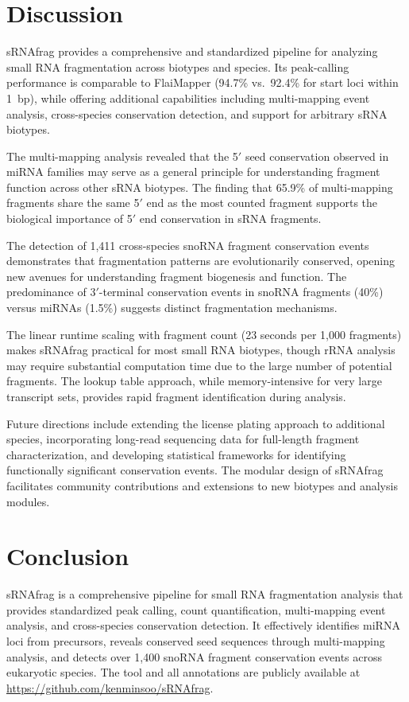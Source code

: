 \documentclass{article}
\begin{document}
\section{Discussion}

sRNAfrag provides a comprehensive and standardized pipeline for analyzing small RNA fragmentation across biotypes and species. Its peak-calling performance is comparable to FlaiMapper (94.7\% vs.\ 92.4\% for start loci within 1~bp), while offering additional capabilities including multi-mapping event analysis, cross-species conservation detection, and support for arbitrary sRNA biotypes.

The multi-mapping analysis revealed that the 5$'$ seed conservation observed in miRNA families may serve as a general principle for understanding fragment function across other sRNA biotypes. The finding that 65.9\% of multi-mapping fragments share the same 5$'$ end as the most counted fragment supports the biological importance of 5$'$ end conservation in sRNA fragments.

The detection of 1,411 cross-species snoRNA fragment conservation events demonstrates that fragmentation patterns are evolutionarily conserved, opening new avenues for understanding fragment biogenesis and function. The predominance of 3$'$-terminal conservation events in snoRNA fragments (40\%) versus miRNAs (1.5\%) suggests distinct fragmentation mechanisms.

The linear runtime scaling with fragment count (23 seconds per 1,000 fragments) makes sRNAfrag practical for most small RNA biotypes, though rRNA analysis may require substantial computation time due to the large number of potential fragments. The lookup table approach, while memory-intensive for very large transcript sets, provides rapid fragment identification during analysis.

Future directions include extending the license plating approach to additional species, incorporating long-read sequencing data for full-length fragment characterization, and developing statistical frameworks for identifying functionally significant conservation events. The modular design of sRNAfrag facilitates community contributions and extensions to new biotypes and analysis modules.

\section{Conclusion}

sRNAfrag is a comprehensive pipeline for small RNA fragmentation analysis that provides standardized peak calling, count quantification, multi-mapping event analysis, and cross-species conservation detection. It effectively identifies miRNA loci from precursors, reveals conserved seed sequences through multi-mapping analysis, and detects over 1,400 snoRNA fragment conservation events across eukaryotic species. The tool and all annotations are publicly available at \url{https://github.com/kenminsoo/sRNAfrag}.



\end{document}
